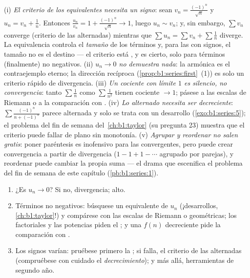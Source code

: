 \begin{remark}
(i) \emph{El criterio de los equivalentes necesita un signo}: sean
$v_n = \frac{(-1)^n}{\sqrt n}$ y $u_n = v_n + \frac1n$. Entonces
$\frac{u_n}{v_n} = 1 + \frac{(-1)^n}{\sqrt n} \to 1$, luego
$u_n \sim v_n$; y, sin embargo, $\sum v_n$ converge (criterio de las
alternadas) mientras que $\sum u_n = \sum v_n + \sum \frac1n$
diverge. La equivalencia controla el \emph{tamaño} de los términos y,
para las  con signos, el tamaño no es el destino --- el
criterio está , y es cierto, solo para términos (finalmente)
no negativos. (ii) \emph{$u_n \to 0$ no demuestra nada}: la 
armónica es el contraejemplo eterno; la dirección recíproca
(\cref{prop:b1:series:first}~(1)) es solo un criterio rápido de
divergencia. (iii) \emph{Un cociente con límite $1$ es silencio, no
convergencia}: tanto $\sum\frac1n$ como $\sum\frac{1}{n^2}$ tienen
cociente $\to 1$; pásese a las escalas de Riemann o a la comparación
con . (iv) \emph{Lo alternado necesita ser decreciente}:
$\sum \frac{(-1)^n}{n + (-1)^n}$ parece alternada y solo se trata con
un desarrollo (\cref{exo:b1:series:5}); el problema del fin de semana
del~\cref{ch:b1:taylor} (su pregunta 23) muestra que el criterio
puede fallar de plano sin monotonía. (v) \emph{Agrupar y reordenar no
salen gratis}: poner paréntesis es inofensivo para las 
convergentes, pero puede crear convergencia a partir de divergencia
($1 - 1 + 1 - \cdots$ agrupado por parejas), y reordenar puede
cambiar la propia suma --- el drama que escenifica el problema del
fin de semana de este capítulo (\cref{pb:b1:series:1}).
\end{remark}

\begin{method}\label{met:b1:series:decide}
\begin{enumerate}
  \item ¿Es $u_n \to 0$? Si no, divergencia; alto.
  \item Términos no negativos: búsquese un equivalente de $u_n$
        (¡desarrollos, \cref{ch:b1:taylor}!) y compárese con las
        escalas de Riemann o geométricas; los factoriales y las
        potencias piden el ; y una $f(n)$
        decreciente pide la comparación con .
  \item Los signos varían: pruébese primero la ; si falla, el criterio de las alternadas
        (compruébese con cuidado el \emph{decrecimiento}); y más
        allá, herramientas de segundo año.
\end{enumerate}
\end{method}

